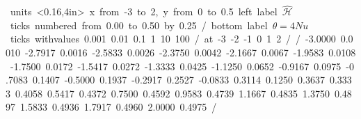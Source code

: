 \mbox{\beginpicture
\setcoordinatesystem units <0.16\textwidth,4in>
\setplotarea x from -3 to 2, y from 0 to 0.5
\axis left label {$\mathcal{\hat H}$} ticks numbered from 0.00 to 0.50 by 0.25 /
\axis bottom label {$\theta = 4Nu$}
  ticks withvalues {0.001} {0.01} {0.1} {1} {10} {100} /
  at {-3} {-2} {-1} {0} {1} {2} / /
\plot
    -3.0000   0.0010
    -2.7917   0.0016
    -2.5833   0.0026
    -2.3750   0.0042
    -2.1667   0.0067
    -1.9583   0.0108
    -1.7500   0.0172
    -1.5417   0.0272
    -1.3333   0.0425
    -1.1250   0.0652
    -0.9167   0.0975
    -0.7083   0.1407
    -0.5000   0.1937
    -0.2917   0.2527
    -0.0833   0.3114
     0.1250   0.3637
     0.3333   0.4058
     0.5417   0.4372
     0.7500   0.4592
     0.9583   0.4739
     1.1667   0.4835
     1.3750   0.4897
     1.5833   0.4936
     1.7917   0.4960
     2.0000   0.4975
/
\endpicture}

